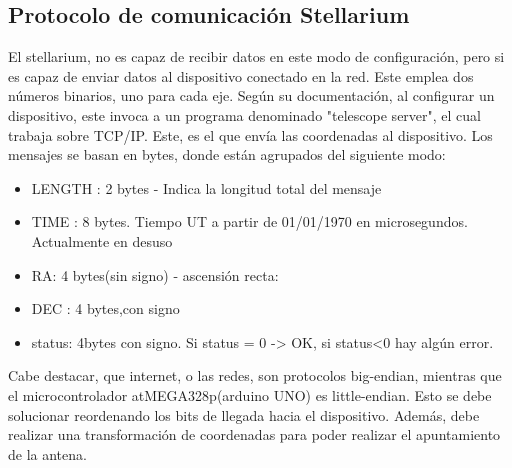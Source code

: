\subsection{Protocolo de comunicación Stellarium} \label{sub:comun_stell}
El stellarium, no es capaz de recibir datos en este modo de configuración, pero si es capaz de enviar datos al dispositivo conectado en la red. Este emplea dos números binarios, uno para cada eje. Según su documentación, al configurar un dispositivo, este invoca a un programa denominado "telescope server", el cual trabaja sobre TCP/IP. Este, es el que envía las coordenadas al dispositivo. Los mensajes se basan en bytes, donde están agrupados del siguiente modo: 

\begin{itemize}
	\item LENGTH : 2 bytes - Indica la longitud total del mensaje
	\item TIME : 8 bytes. Tiempo UT a partir de 01/01/1970 en microsegundos. Actualmente en desuso 
	\item RA: 4 bytes(sin signo) - ascensión recta: 
	\item DEC : 4 bytes,con signo
	\item status: 4bytes con signo. Si status = 0 -> OK, si status<0 hay algún error.  
\end{itemize}

Cabe destacar, que internet, o las redes, son protocolos big-endian, mientras que el microcontrolador atMEGA328p(arduino UNO) es little-endian. Esto se debe solucionar reordenando los bits de llegada hacia el dispositivo. Además, debe realizar una transformación de coordenadas para poder realizar el apuntamiento de la antena. 

